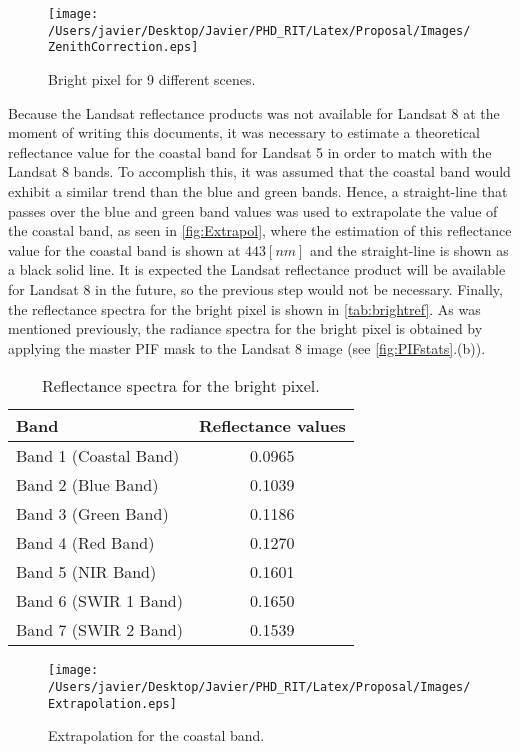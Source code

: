 \begin{figure}[htb]
  	\centering
  	\texttt{[image: /Users/javier/Desktop/Javier/PHD\_RIT/Latex/Proposal/Images/ZenithCorrection.eps]}
  \caption{Bright pixel for 9 different scenes. \label{fig:ZenithCorr} } 
\end{figure}
Because the Landsat reflectance products was not available for Landsat 8 at the moment of writing this documents, it was necessary to estimate a theoretical reflectance value for the coastal band for Landsat 5 in order to match with the Landsat 8 bands. To accomplish this, it was assumed that the coastal band would exhibit a similar trend than the blue and green bands. Hence, a straight-line that passes over the blue and green band values was used to extrapolate the value of the coastal band, as seen in \autoref{fig:Extrapol}, where the estimation of this reflectance value for the coastal band is shown at $443 [nm]$ and the straight-line is shown as a black solid line. It is expected the Landsat reflectance product will be available for Landsat 8 in the future, so the previous step would not be necessary. Finally, the reflectance spectra for the bright pixel is shown in \autoref{tab:brightref}. As was mentioned previously, the radiance spectra for the bright pixel is obtained by applying the master PIF mask to the Landsat 8 image (see \autoref{fig:PIFstats}.(b)).
\vspace{.5cm}
\begin{table}[!ht]
\caption{ Reflectance spectra for the bright pixel. \label{tab:brightref} } 
\centering
\begin{tabular}{l|c} 
 \bfseries{Band} & \bfseries{Reflectance values}\\ \hline \hline
 Band 1 (Coastal Band) &  0.0965 \\
 Band 2 (Blue Band) &  0.1039 \\
 Band 3 (Green Band) &  0.1186 \\
 Band 4 (Red Band) &  0.1270 \\
 Band 5 (NIR Band) &  0.1601 \\
 Band 6 (SWIR 1 Band) &  0.1650 \\ 
 Band 7 (SWIR 2 Band) &  0.1539 \\ 
 \end{tabular}
\end{table}

\begin{figure}[htb]
  	\centering
  	\texttt{[image: /Users/javier/Desktop/Javier/PHD\_RIT/Latex/Proposal/Images/Extrapolation.eps]}
  \caption{Extrapolation for the coastal band. \label{fig:Extrapol} } 
\end{figure}


